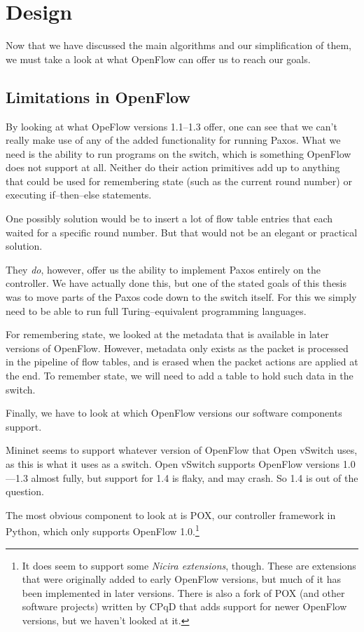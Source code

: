 \chapter{Design}
\label{chapter:design}

Now that we have discussed the main algorithms and our simplification of
them, we must take a look at what OpenFlow can offer us to reach our goals.



\section{Limitations in OpenFlow}

By looking at what OpeFlow versions 1.1--1.3 offer, one can see that we can't really
make use of any of the added functionality for running Paxos.  What we need
is the ability to run programs on the switch, which is something OpenFlow
does not support at all.  Neither do their action primitives add up to
anything that could be used for remembering state (such as the current round
number) or executing if--then--else statements.

One possibly solution would be to insert a lot of flow table entries that
each waited for a specific round number.  But that would not be an elegant
or practical solution.

They \textit{do}, however, offer us the ability to implement Paxos entirely
on the controller.  We have actually done this, but one of the stated goals
of this thesis was to move parts of the Paxos code down to the switch
itself.  For this we simply need to be able to run full Turing--equivalent
programming languages.

For remembering state, we looked at the metadata that is available in later
versions of OpenFlow.  However, metadata only exists as the packet is
processed in the pipeline of flow tables, and is erased when the packet
actions are applied at the end.  To remember state, we will need to add a
table to hold such data in the switch.

Finally, we have to look at which OpenFlow versions our software components
support.

Mininet seems to support whatever version of OpenFlow that Open vSwitch uses,
as this is what it uses as a switch.  Open vSwitch
supports OpenFlow versions 1.0---1.3 almost fully, but support for 1.4 is
flaky, and may crash.  So 1.4
is out of the question.

The most obvious component to look at is POX, our controller framework in
Python, which only supports OpenFlow 1.0.\footnote{It does seem to support
some \textit{Nicira extensions}, though.  These are
extensions that were originally added to early OpenFlow versions, but
much of it has been implemented in later versions.  There is also a fork
of POX (and other software projects) written by CPqD that adds support
for newer OpenFlow versions, but we haven't looked at it.}

